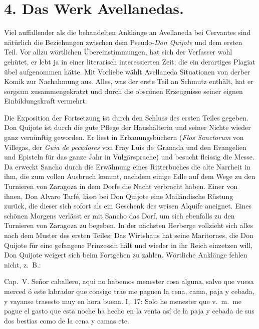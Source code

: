 \section{4. Das Werk Avellanedas.}

Viel auffallender als die behandelten Anklänge an Avellaneda bei
Cervantes sind nätürlich die Beziehungen zwischen dem Pseudo-{\it Don Quijote}
und dem ersten Teil. Vor allzu wörtlichen Übereinstimmungen,
hat sich der Verfasser wohl gehütet, er lebt ja in einer literarisch
interessierten Zeit, die ein derartiges Plagiat übel aufgenommen hätte.
Mit Vorliebe wählt Avellaneda Situationen von derber Komik zur Nachahmung
aus. Alles, was der erste Teil an Schmutz enthält, hat er sorgsam
zusammengekratzt und durch die obscönen Erzeugnisse seiner
eignen Einbildungskraft vermehrt.

Die Exposition der Fortsetzung ist durch den Schluss des ersten
Teiles gegeben. Don Quijote ist durch die gute Pflege der Haushälterin
und seiner Nichte wieder ganz vernünftig geworden. Er liest in
Erbauungsbüchern ({\it Flos Sanctorum} von Villegas, der {\it\spanish Guia de pecadores}
von Fray Luis de~Granada und den {\quoted Evangelien und Episteln für das
ganze Jahr in Vulgärsprache}) und besucht fleissig die Messe. Da erweckt
Sancho durch die Erwähnung eines Ritterbuches die alte Narrheit in
ihm, die zum vollen Ausbruch kommt, nachdem einige Edle auf
dem Wege zu den Turnieren von Zaragoza in dem Dorfe die Nacht
verbracht haben. Einer von ihnen, Don Alvaro Tarfé, lässt bei Don
Quijote eine Mailändische Rüstung zurück, die dieser sich sofort als
ein Geschenk des weisen Alquife aneignet. Eines schönen Morgens
verlässt er mit Sancho das Dorf, um sich ebenfalls zu den Turnieren
von Zaragoza zu begeben. In der nächsten Herberge vollzieht sich
alles nach dem Muster des ersten Teiles: Das Wirtshaus hat seine
Maritornes, die Don Quijote für eine gefangene Prinzessin hält und
wieder in ihr Reich einzetzen will, Don Quijote weigert sich beim
Fortgehen zu zahlen. Wörtliche Anklänge fehlen nicht, z.~B.:

\begin{multicols}{2}
Cap.~V. {\itquoted\spanish Señor caballero, aqui
no habemos menester cosa alguna,
salvo que vuesa merced ó este
labrador que consigo trae me
paguen la cena, cama, paja y
cebada, y vayanse trasesto muy
en hora buena}.
\columnbreak
I,~17: {\itquoted\spanish Solo he menester que
v.~m.\ me pague el gasto que esta
noche ha hecho en la venta así
de la paja y cebada de sus dos
bestias como de la cena y camas
etc.}
\end{multicols}


